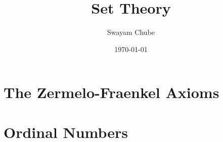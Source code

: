 \documentclass[oneside,a4paper]{report}
\title{Set Theory}
\author{Swayam Chube}
\date{\today}
\begin{document}
\maketitle
\tableofcontents

\chapter{The Zermelo-Fraenkel Axioms}


\chapter{Ordinal Numbers}

\end{document}
